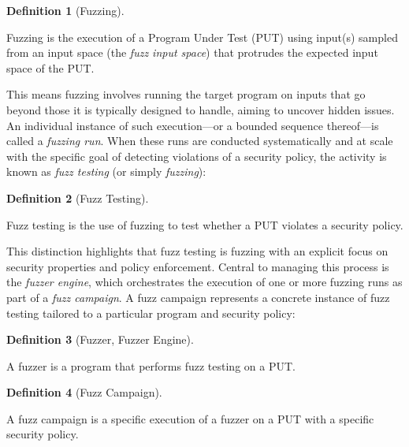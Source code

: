 \documentclass[
  a4paper,
]{scrreprt}
\theoremstyle{definition}
\newtheorem{definition}{Definition}[chapter]
\theoremstyle{remark}
\begin{document}
\begin{definition}[Fuzzing]\protect\hypertarget{def-fuzzing}{}\label{def-fuzzing}

Fuzzing is the execution of a Program Under Test (PUT) using input(s)
sampled from an input space (the \emph{fuzz input space}) that protrudes
the expected input space of the PUT.

\end{definition}

This means fuzzing involves running the target program on inputs that go
beyond those it is typically designed to handle, aiming to uncover
hidden issues. An individual instance of such execution---or a bounded
sequence thereof---is called a \emph{fuzzing run}. When these runs are
conducted systematically and at scale with the specific goal of
detecting violations of a security policy, the activity is known as
\emph{fuzz testing} (or simply \emph{fuzzing}):

\begin{definition}[Fuzz
Testing]\protect\hypertarget{def-fuzz-testing}{}\label{def-fuzz-testing}

Fuzz testing is the use of fuzzing to test whether a PUT violates a
security policy.

\end{definition}

This distinction highlights that fuzz testing is fuzzing with an
explicit focus on security properties and policy enforcement. Central to
managing this process is the \emph{fuzzer engine}, which orchestrates
the execution of one or more fuzzing runs as part of a \emph{fuzz
campaign}. A fuzz campaign represents a concrete instance of fuzz
testing tailored to a particular program and security policy:

\begin{definition}[Fuzzer, Fuzzer
Engine]\protect\hypertarget{def-fuzzer}{}\label{def-fuzzer}

A fuzzer is a program that performs fuzz testing on a PUT.

\end{definition}

\begin{definition}[Fuzz
Campaign]\protect\hypertarget{def-campaign}{}\label{def-campaign}

A fuzz campaign is a specific execution of a fuzzer on a PUT with a
specific security policy.

\end{definition}
\end{document}

